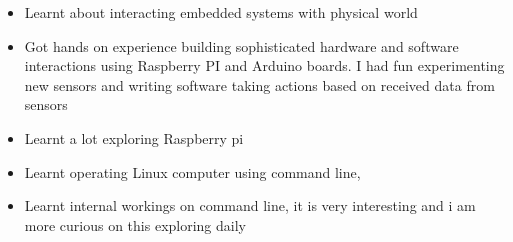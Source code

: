 \documentclass[10pt,a4paper,ragged2e]{altacv}
\begin{document}


\begin{fullwidth}
\makecvheader
\end{fullwidth}



\begin{itemize}
\item {Learnt about interacting embedded systems with physical world}
\smallskip
\item {Got hands on experience building sophisticated hardware and software interactions using Raspberry PI
and Arduino boards. I had fun experimenting new sensors and writing software taking actions based on received
data from sensors}
\smallskip
\item {Learnt a lot exploring Raspberry pi}
\end{itemize}

\divider

\begin{itemize}
\item Learnt operating Linux computer using command line,  
\smallskip
\item {Learnt internal workings on command line, it is very interesting and i am more curious on this exploring daily}
\end{itemize}

\divider
\end{document}
